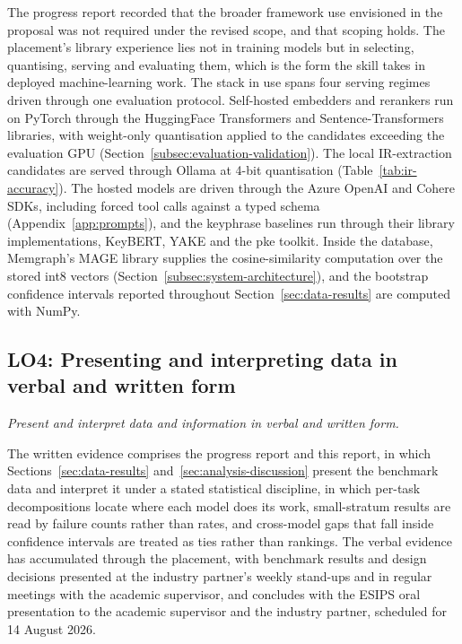 The progress report recorded that the broader framework use envisioned in
the proposal was not required under the revised scope, and that scoping
holds. The placement's library experience lies not in training models but
in selecting, quantising, serving and evaluating them, which is the form
the skill takes in deployed machine-learning work. The stack in use spans
four serving regimes driven through one evaluation protocol. Self-hosted
embedders and rerankers run on PyTorch through the HuggingFace
Transformers and Sentence-Transformers libraries, with weight-only
quantisation applied to the candidates exceeding the evaluation GPU
(Section~\ref{subsec:evaluation-validation}). The local IR-extraction
candidates are served through Ollama at 4-bit quantisation
(Table~\ref{tab:ir-accuracy}). The hosted models are driven through the
Azure OpenAI and Cohere SDKs, including forced tool calls against a typed
schema (Appendix~\ref{app:prompts}), and the keyphrase baselines run
through their library implementations, KeyBERT, YAKE and the pke toolkit.
Inside the database, Memgraph's MAGE library supplies the
cosine-similarity computation over the stored int8 vectors
(Section~\ref{subsec:system-architecture}), and the bootstrap confidence intervals
reported throughout Section~\ref{sec:data-results} are computed with NumPy.

\subsection{LO4: Presenting and interpreting data in verbal and written form}
\textit{Present and interpret data and information in verbal and written
form.}

The written evidence comprises the progress report and this report, in
which Sections~\ref{sec:data-results} and~\ref{sec:analysis-discussion} present the
benchmark data and interpret it under a stated statistical discipline, in
which per-task decompositions locate where each model does its work,
small-stratum results are read by failure counts rather than rates, and
cross-model gaps that fall inside confidence intervals are treated as
ties rather than rankings. The verbal evidence has accumulated through
the placement, with benchmark results and design decisions presented at
the industry partner's weekly stand-ups and in regular meetings with the
academic supervisor, and concludes with the ESIPS oral presentation to
the academic supervisor and the industry partner, scheduled for
14 August 2026.